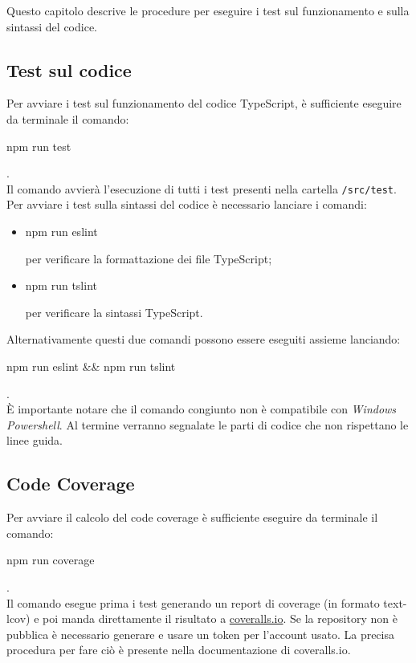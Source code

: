 Questo capitolo descrive le procedure per eseguire i test sul funzionamento e sulla sintassi del codice.
\subsection{Test sul codice}
Per avviare i test sul funzionamento del codice TypeScript, è sufficiente eseguire da terminale il comando:
\\[0.2cm]
\hspace*{10mm}
\begin{ttfamily}
	npm run test
\end{ttfamily}.
\\[0.2cm]
Il comando avvierà l'esecuzione di tutti i test presenti nella cartella \texttt{/src/test}.
Per avviare i test sulla sintassi del codice è necessario lanciare i comandi:
\begin{itemize}
	\item \begin{ttfamily}npm run eslint\end{ttfamily} per verificare la formattazione dei file TypeScript;
	\item \begin{ttfamily}npm run tslint\end{ttfamily}
	per verificare la sintassi TypeScript.
\end{itemize}
Alternativamente questi due comandi possono essere eseguiti assieme lanciando:\\[0.2cm]
\hspace*{10mm}
\begin{ttfamily}
npm run eslint \&\& npm run tslint
\end{ttfamily}.
\\[0.2cm]
È importante notare che il comando congiunto non è compatibile con \emph{Windows Powershell}.
Al termine verranno segnalate le parti di codice che non rispettano le linee guida.

\subsection{Code Coverage}
Per avviare il calcolo del code coverage è sufficiente eseguire da terminale il comando:
\\[0.2cm]
\hspace*{10mm}
\begin{ttfamily}
	npm run coverage
\end{ttfamily}.
\\[0.2cm]
Il comando esegue prima i test generando un report di coverage (in formato text-lcov) e poi manda direttamente il risultato a \href{https://coveralls.io/}{coveralls.io}.
Se la repository non è pubblica è necessario generare e usare un token per l'account usato. La precisa procedura per fare ciò è presente nella documentazione di coveralls.io.